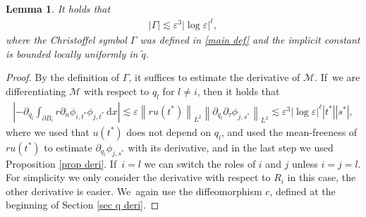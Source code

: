 \documentclass[10pt]{amsart}
\let\epsilon\varepsilon
\newtheorem{lemma}[theorem]{Lemma}
\theoremstyle{definition}
\newcommand\norm[1]{\left\lVert #1\right\rVert}
\newcommand\dd{\,\mathrm{d}}
\newcommand\dx{\dd x}
\let\de\partial
\let\eps\epsilon
\begin{document}
\begin{lemma}\label{conv Gamma}
It holds that
\begin{align*}
|\Gamma|\lesssim \eps^3|{\log\eps}|^\ell,
\end{align*}
where the Christoffel symbol $\Gamma$ was defined in \ref{main def} and the implicit constant is bounded locally uniformly in $\tilde{q}$.
\end{lemma}
\begin{proof}
By the definition of $\Gamma$, it suffices to estimate the derivative of $\mathcal{M}$. If~we are differentiating $\mathcal{M}$ with respect to $q_l$ for $l\neq i$, then it holds that
\begin{align*}
\left|-\de_{q_l}\int_{\de B_i}r\de_n\phi_{i,t^*}\phi_{j,t^*}\dx\right|\lesssim \eps\norm{ru(t^*)}_{L^2}\norm{\de_{q_l}\de_\tau\phi_{j,s^*}}_{L^2}\lesssim \eps^3|{\log\eps}|^\ell|t^*||s^*|,
\end{align*}
where we used that $u(t^*)$ does not depend on $q_l$, and used the mean-freeness of $ru(t^*)$ to estimate $\de_{q_l}\phi_{j,s^*}$ with its derivative, and in the last step we used Proposition \ref{prop deri}. If~$i=l$ we can switch the roles of $i$ and $j$ unless $i=j=l$. For simplicity we only consider the derivative with respect to $R_i$ in this case, the other derivative is easier. We~again use the diffeomorphism $c$, defined at the beginning of Section \ref{sec q deri}.


\end{proof}
\end{document}
